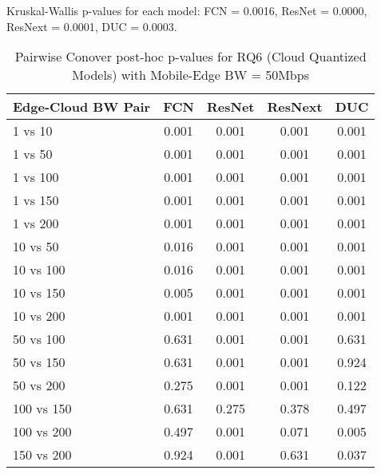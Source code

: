 \begin{table}[h]
\centering
\caption{Pairwise Conover post-hoc p-values for RQ6 (Cloud Quantized Models) with Mobile-Edge BW = 50Mbps}
\label{tab:conover_cloud_quantized_me50}
\smallskip
Kruskal-Wallis p-values for each model: FCN = 0.0016, ResNet = 0.0000, ResNext = 0.0001, DUC = 0.0003.

\begin{tabular}{lcccc}
\toprule
Edge-Cloud BW Pair & FCN & ResNet & ResNext & DUC \\
\midrule
1 vs 10 & 0.001 & 0.001 & 0.001 & 0.001 \\
1 vs 50 & 0.001 & 0.001 & 0.001 & 0.001 \\
1 vs 100 & 0.001 & 0.001 & 0.001 & 0.001 \\
1 vs 150 & 0.001 & 0.001 & 0.001 & 0.001 \\
1 vs 200 & 0.001 & 0.001 & 0.001 & 0.001 \\
10 vs 50 & 0.016 & 0.001 & 0.001 & 0.001 \\
10 vs 100 & 0.016 & 0.001 & 0.001 & 0.001 \\
10 vs 150 & 0.005 & 0.001 & 0.001 & 0.001 \\
10 vs 200 & 0.001 & 0.001 & 0.001 & 0.001 \\
50 vs 100 & 0.631 & 0.001 & 0.001 & 0.631 \\
50 vs 150 & 0.631 & 0.001 & 0.001 & 0.924 \\
50 vs 200 & 0.275 & 0.001 & 0.001 & 0.122 \\
100 vs 150 & 0.631 & 0.275 & 0.378 & 0.497 \\
100 vs 200 & 0.497 & 0.001 & 0.071 & 0.005 \\
150 vs 200 & 0.924 & 0.001 & 0.631 & 0.037 \\
\bottomrule
\end{tabular}
\end{table}

